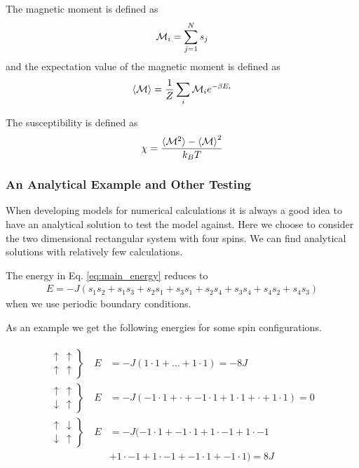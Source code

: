 \documentclass[11pt, a4paper]{article}
\begin{document}
The magnetic moment is defined as
\begin{gather}
{\cal M}_i = \sum\limits_{j=1}^N s_j
\end{gather}
and the expectation value of the magnetic moment is defined as
\begin{gather}
\braket{\cal M} = \frac{1}{Z}\sum\limits_{i}{\cal M}_ie^{-\beta E_i}
\end{gather}

The susceptibility is defined as 
\begin{gather}
\chi = \frac{\braket{{\cal M}^2}-\braket{\cal M}^2}{k_BT}
\label{eq:main_suscept}
\end{gather}



\subsubsection{An Analytical Example and Other Testing}
When developing models for numerical calculations it is always a good idea to have an analytical solution to test the model against. Here we choose to consider the two dimensional rectangular system with four spins. We can find analytical solutions with relatively few calculations. 

The energy in Eq. \eqref{eq:main_energy} reduces to 
\begin{gather}
E = -J(s_1s_2 + s_1s_3 + s_2s_1  + s_3s_1 + s_2s_4 + s_3s_4 + s_4s_2 + s_4s_3)
\end{gather}
when we use periodic boundary conditions.

As an example we get the following energies for some spin configurations.

\begin{gather}
\begin{aligned}
\left.\begin{array}{ll}
	\uparrow & \uparrow\\
	\uparrow & \uparrow
\end{array}\right\}
\quad E &= -J(1\cdot1 + \dots + 1\cdot1) = -8J
\\
\left.\begin{array}{ll}
	\uparrow & \uparrow\\
	\downarrow & \uparrow
\end{array}\right\}
\quad E &= -J(-1\cdot1 + \cdot + -1\cdot1 +1\cdot1 + \cdot + 1\cdot1) = 0
\\
\left.\begin{array}{ll}
	\uparrow & \downarrow\\
	\downarrow & \uparrow
\end{array}\right\}
\quad E &= -J(-1\cdot1 + -1\cdot1 + 1\cdot-1 + 1\cdot-1 \\
&+1\cdot-1 + 1\cdot-1 + -1\cdot1 + -1\cdot1) = 8J
\end{aligned}
\end{gather}
\end{document}
